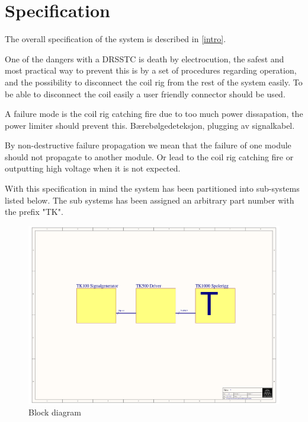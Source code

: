 \section{Specification}
The overall specification of the system is described in \cref{intro}.

One of the dangers with a DRSSTC is death by electrocution, the safest and most practical way to prevent this is by a set of procedures regarding operation, and the possibility to disconnect the coil rig from the rest of the system easily. To be able to disconnect the coil easily a user friendly connector should be used.

A failure mode is the coil rig catching fire due to too much power dissapation, the power limiter should prevent this. Bærebølgedeteksjon, plugging av signalkabel.

By non-destructive failure propagation we mean that the failure of one module should not propagate to another module. Or lead to the coil rig catching fire or outputting high voltage when it is not expected.





With this specification in mind the system has been partitioned into sub-systems listed below. The sub systems has been assigned an arbitrary part number with the prefix "TK".

\begin{figure}
    \centering
    \includegraphics[trim={5cm 9cm 4.8cm 6.5cm},clip,width=\textwidth]{img/Blokkskjema.pdf}
    \caption{Block diagram}
    \label{fig:blokksjema}
\end{figure}

